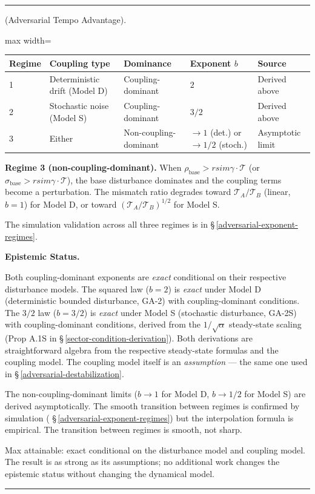 \documentclass[11pt,oneside]{article}
\newcounter{claim}[section]
\renewcommand{\theclaim}{\thesection.\arabic{claim}}
\newenvironment{segment}[2]{%
  \refstepcounter{claim}%
  \bigskip\noindent\hrule\smallskip
  \noindent{\bfseries #1~\theclaim}\enskip(#2).\par\smallskip
  \noindent\ignorespaces
}{%
  \par\smallskip\noindent\hrule\bigskip
}
\newenvironment{theorem}[1][]{\begin{segment}{Theorem}{#1}}{\end{segment}}
\begin{document}
\begin{theorem}[Adversarial Tempo Advantage]
\begin{adjustbox}{max width=\textwidth}
\small
\begin{tabular}{lllll}
\toprule
Regime & Coupling type & Dominance & Exponent $b$ & Source \\
\midrule
1 & Deterministic drift (Model D) & Coupling-dominant & $2$ & Derived above \\
2 & Stochastic noise (Model S) & Coupling-dominant & $3/2$ & Derived above \\
3 & Either & Non-coupling-dominant & $\to 1$ (det.) or $\to 1/2$ (stoch.) & Asymptotic limit \\
\bottomrule
\end{tabular}
\end{adjustbox}


\textbf{Regime 3 (non-coupling-dominant).} When $\rho_{\text{base}} >rsim \gamma \cdot \mathcal{T}$ (or $\sigma_{\text{base}} >rsim \gamma \cdot \mathcal{T}$), the base disturbance dominates and the coupling terms become a perturbation. The mismatch ratio degrades toward $\mathcal T_A / \mathcal T_B$ (linear, $b = 1$) for Model D, or toward $(\mathcal T_A / \mathcal T_B)^{1/2}$ for Model S.

The simulation validation across all three regimes is in \S\,\ref{adversarial-exponent-regimes}.


\medskip\noindent\textbf{Epistemic Status.}


Both coupling-dominant exponents are \textit{exact} conditional on their respective disturbance models. The squared law ($b = 2$) is \textit{exact} under Model D (deterministic bounded disturbance, GA-2) with coupling-dominant conditions. The $3/2$ law ($b = 3/2$) is \textit{exact} under Model S (stochastic disturbance, GA-2S) with coupling-dominant conditions, derived from the $1/\sqrt{\alpha}$ steady-state scaling (Prop A.1S in \S\,\ref{sector-condition-derivation}). Both derivations are straightforward algebra from the respective steady-state formulas and the coupling model. The coupling model itself is an \textit{assumption} — the same one used in \S\,\ref{adversarial-destabilization}.

The non-coupling-dominant limits ($b \to 1$ for Model D, $b \to 1/2$ for Model S) are derived asymptotically. The smooth transition between regimes is confirmed by simulation ( \S\,\ref{adversarial-exponent-regimes}) but the interpolation formula is empirical. The transition between regimes is smooth, not sharp.

Max attainable: exact conditional on the disturbance model and coupling model. The result is as strong as its assumptions; no additional work changes the epistemic status without changing the dynamical model.



\end{theorem}
\end{document}
